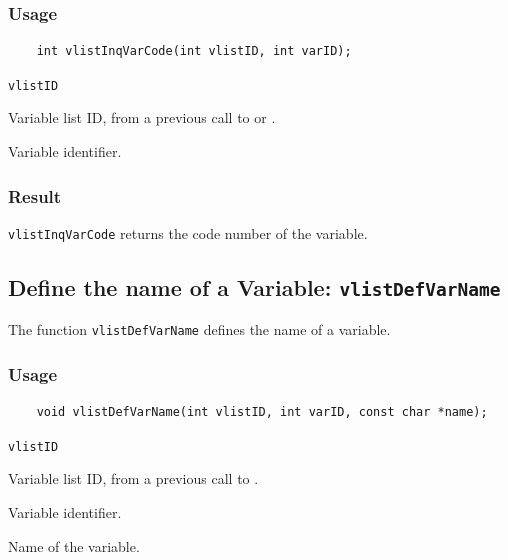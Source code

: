 \subsubsection*{Usage}

\begin{verbatim}
    int vlistInqVarCode(int vlistID, int varID);
\end{verbatim}

\hspace*{4mm}\begin{minipage}[]{15cm}
\begin{deflist}{\texttt{vlistID}\ }
\item[\texttt{vlistID}]
Variable list ID, from a previous call to {} or {}.
\item[\texttt{varID}]
Variable identifier.

\end{deflist}
\end{minipage}

\subsubsection*{Result}

{\texttt{vlistInqVarCode}} returns the code number of the variable.



\subsection{Define the name of a Variable: \texttt{vlistDefVarName}}
\label{vlistDefVarName}

The function {\texttt{vlistDefVarName}} defines the name of a variable.

\subsubsection*{Usage}

\begin{verbatim}
    void vlistDefVarName(int vlistID, int varID, const char *name);
\end{verbatim}

\hspace*{4mm}\begin{minipage}[]{15cm}
\begin{deflist}{\texttt{vlistID}\ }
\item[\texttt{vlistID}]
Variable list ID, from a previous call to {}.
\item[\texttt{varID}]
Variable identifier.
\item[\texttt{name}]
Name of the variable.

\end{deflist}
\end{minipage}


